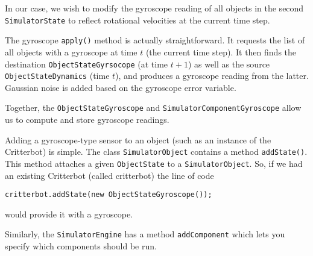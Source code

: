 \documentclass[12pt]{article}
\newcommand{\code}[1]{\texttt{#1}}
\begin{document}
In our case, we wish to modify the gyroscope reading of all
objects in the second \code{SimulatorState} to reflect rotational velocities
at the current time step. 

The gyroscope \code{apply()} method is actually straightforward. It requests
the list of all objects with a gyroscope at time $t$ (the current time step).
It then finds the destination \code{ObjectStateGyrsocope} (at time $t+1$)
as well as the source \code{ObjectStateDynamics} (time $t$), and produces a 
gyroscope reading from the latter. Gaussian noise is added based on the
gyroscope error variable.

Together, the \code{ObjectStateGyroscope} and 
\code{SimulatorComponentGyroscope} allow us to compute and store gyroscope
readings. 

Adding a gyroscope-type sensor to an object (such as an instance of
the Critterbot) is simple. The class \code{SimulatorObject} contains a method
\code{addState()}. This method attaches a given \code{ObjectState} to a
\code{SimulatorObject}. So, if we had an existing Critterbot (called critterbot)
the line of code

\begin{verbatim}
critterbot.addState(new ObjectStateGyroscope());
\end{verbatim}

would provide it with a gyroscope.

Similarly, the \code{SimulatorEngine} has a method \code{addComponent} which
lets you specify which components should be run.
\end{document}
